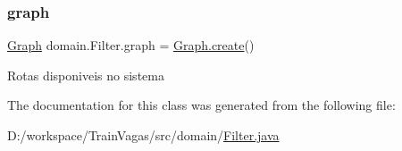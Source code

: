 \subsubsection{\texorpdfstring{graph}{graph}}
{\footnotesize\ttfamily \hyperlink{classdomain_1_1_graph}{Graph} domain.\+Filter.\+graph = \hyperlink{classdomain_1_1_graph_a57ce4efd344c059a565f4bb104fdee64}{Graph.\+create}()\hspace{0.3cm}{\ttfamily [package]}}

Rotas disponiveis no sistema 

The documentation for this class was generated from the following file\+:\begin{DoxyCompactItemize}
\item 
D\+:/workspace/\+Train\+Vagas/src/domain/\hyperlink{_filter_8java}{Filter.\+java}\end{DoxyCompactItemize}
